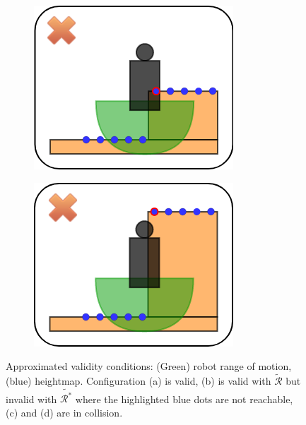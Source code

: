 \begin{figure}
\begin{subfigure}[t]{.48\linewidth}
    \end{subfigure}
    \begin{subfigure}[t]{.48\linewidth}
    \includegraphics[width=\textwidth]{Figures/Chapter_LEAS/approx2.png}
    \caption{\label{fig:approximation_validity_2}}
    \end{subfigure}
    \begin{subfigure}[t]{.48\linewidth}
    \includegraphics[width=\textwidth]{Figures/Chapter_LEAS/approx3.png}
    \caption{\label{fig:approximation_validity_3}}
    \end{subfigure}
    \caption{Approximated validity conditions: (Green) robot range of motion, (blue) heightmap. Configuration (a) is valid, (b) is valid with $\tilde{\mathcal{R}}$ but invalid with $\tilde{\mathcal{R}^*}$ where the highlighted blue dots are not reachable, (c) and (d) are in collision.}
    \label{fig:approximation_validity}
\end{figure}


